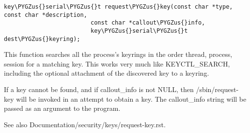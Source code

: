 \documentclass[a4paper,8pt,english]{sphinxmanual}
\def\PYGZus{\char`\_}
\begin{document}
\begin{itemize}
\begin{Verbatim}[commandchars=\\\{\}]
key\PYGZus{}serial\PYGZus{}t request\PYGZus{}key(const char *type, const char *description,
                         const char *callout\PYGZus{}info,
                         key\PYGZus{}serial\PYGZus{}t dest\PYGZus{}keyring);
\end{Verbatim}

This function searches all the process's keyrings in the order thread,
process, session for a matching key. This works very much like
KEYCTL\_SEARCH, including the optional attachment of the discovered key to
a keyring.

If a key cannot be found, and if callout\_info is not NULL, then
/sbin/request-key will be invoked in an attempt to obtain a key. The
callout\_info string will be passed as an argument to the program.

See also Documentation/security/keys/request-key.rst.

\end{itemize}
\end{document}
